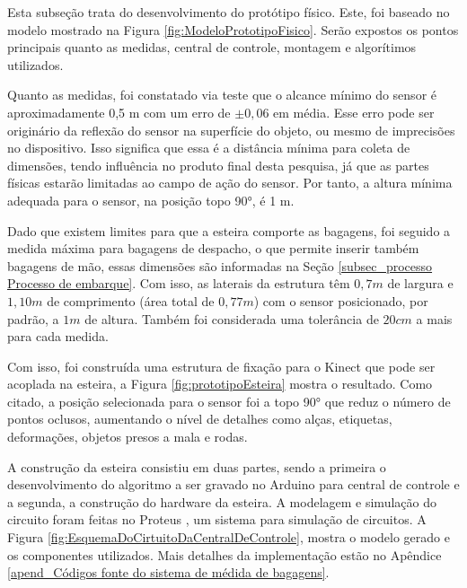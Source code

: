     Esta subseção trata do desenvolvimento do protótipo físico. Este, foi baseado no modelo mostrado na Figura \ref{fig:ModeloPrototipoFisico}. Serão expostos os pontos principais quanto as medidas, central de controle, montagem e algorítimos utilizados. 
    

    Quanto as medidas, foi constatado via teste que o alcance mínimo do sensor é aproximadamente 0,5 m com um erro de $\pm{0,06}$ em média. Esse erro pode ser originário da reflexão do sensor na superfície do objeto, ou mesmo de imprecisões no dispositivo. Isso significa que essa é a distância mínima para coleta de dimensões, tendo influência no produto final desta pesquisa, já que as partes físicas estarão limitadas ao campo de ação do sensor. Por tanto, a altura mínima adequada para o sensor, na posição topo 90°, é 1 m. 
    
    Dado que existem limites para que a esteira comporte as bagagens, foi seguido a medida máxima para bagagens de despacho, o que permite inserir também bagagens de mão, essas dimensões são  informadas na Seção \ref{subsec_processo Processo de embarque}. Com isso, as laterais da estrutura têm $0,7 m$ de largura e $1,10 m$ de comprimento (área total de $0,77 m$) com o sensor posicionado, por padrão, a $1 m$ de altura. Também foi considerada uma tolerância de $20 cm$ a mais para cada medida. 
    
    Com isso, foi construída uma estrutura de fixação para o Kinect que pode ser acoplada na esteira, a Figura \ref{fig:prototipoEsteira} mostra o resultado. Como citado, a posição selecionada para o sensor foi a topo 90° que reduz o número de pontos oclusos, aumentando o nível de detalhes como alças, etiquetas, deformações, objetos presos a mala e rodas. 





    A construção da esteira consistiu em duas partes, sendo a primeira o desenvolvimento do algoritmo a ser gravado no Arduino para central de controle e a segunda, a construção do hardware da esteira. A modelagem e simulação do circuito foram feitas no Proteus \cite{proteus_2022_pcb}, um sistema para simulação de circuitos. A Figura \ref{fig:EsquemaDoCirtuitoDaCentralDeControle}, mostra o modelo gerado e os componentes utilizados. Mais detalhes da implementação estão no Apêndice \ref{apend_Códigos fonte do sistema de médida de bagagens}.
    
